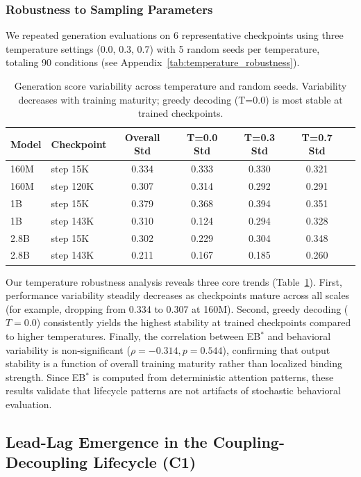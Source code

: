 \documentclass[10pt]{article} %
\begin{document}
\subsubsection{Robustness to Sampling Parameters}

We repeated generation evaluations on 6 representative checkpoints using three temperature settings (0.0, 0.3, 0.7) with 5 random seeds per temperature, totaling 90 conditions (see Appendix~\ref{tab:temperature_robustness}).

\begin{table}[h]
\centering
\small
\begin{tabular}{|l|l|c|c|c|c|c|}
\hline
\textbf{Model} & \textbf{Checkpoint} & \textbf{Overall Std} & \textbf{T=0.0 Std} & \textbf{T=0.3 Std} & \textbf{T=0.7 Std} \\
\hline
160M & step 15K & 0.334 & 0.333 & 0.330 & 0.321 \\
160M & step 120K & 0.307 & 0.314 & 0.292 & 0.291 \\
1B & step 15K & 0.379 & 0.368 & 0.394 & 0.351 \\
1B & step 143K & 0.310 & 0.124 & 0.294 & 0.328 \\
2.8B & step 15K & 0.302 & 0.229 & 0.304 & 0.348 \\
2.8B & step 143K & 0.211 & 0.167 & 0.185 & 0.260 \\
\hline
\end{tabular}
\caption{Generation score variability across temperature and random seeds. Variability decreases with training maturity; greedy decoding (T=0.0) is most stable at trained checkpoints.}
\label{tab:temperature_main}
\end{table}

Our temperature robustness analysis reveals three core trends (Table~\ref{tab:temperature_main}). First, performance variability steadily decreases as checkpoints mature across all scales (for example, dropping from 0.334 to 0.307 at 160M). Second, greedy decoding ($T=0.0$) consistently yields the highest stability at trained checkpoints compared to higher temperatures. Finally, the correlation between EB$^*$ and behavioral variability is non-significant ($\rho = -0.314, p = 0.544$), confirming that output stability is a function of overall training maturity rather than localized binding strength.
Since EB$^*$ is computed from deterministic attention patterns, these results validate that lifecycle patterns are not artifacts of stochastic behavioral evaluation.

\subsection{Lead-Lag Emergence in the Coupling-Decoupling Lifecycle (C1)}
\end{document}
